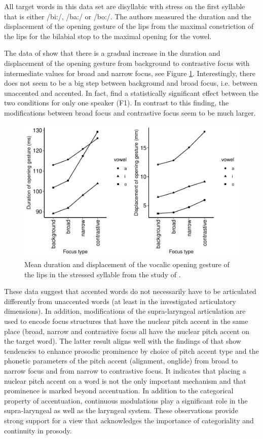 All target words in this data set are disyllabic with stress on the first syllable that is either /bi:/, /ba:/ or /bo:/. The authors measured the duration and the displacement of the opening gesture of the lips from the maximal constriction of the lips for the bilabial stop to the maximal opening for the vowel.

The data of \citet{MückeGrice2014} show that there is a gradual increase in the duration and displacement of the opening gesture from background to contrastive focus with intermediate values for broad and narrow focus, see Figure \ref{fig:muecke_grice_2014}. Interestingly, there does not seem to be a big step between background and broad focus, i.e. between unaccented and accented. In fact, \citet{MückeGrice2014} find a statistically significant effect between the two conditions for only one speaker (F1). In contrast to this finding, the modifications between broad focus and contrastive focus seem to be much larger. 

\begin{figure}
\includegraphics[width=\textwidth]{figures/ch4/muecke_grice_2014.pdf}
\caption{Mean duration and displacement of the vocalic opening gesture of the lips in the stressed syllable from the study of \citet{MückeGrice2014}.}
\label{fig:muecke_grice_2014}
\end{figure}

These data suggest that accented words do not necessarily have to be articulated differently from unaccented words (at least in the investigated articulatory dimensions). In addition, modifications of the supra-laryngeal articulation are used to encode focus structures that have the nuclear pitch accent in the same place (broad, narrow and contrastive focus all have the nuclear pitch accent on the target word). The latter result aligns well with the findings of \citet{Griceetal2017} that show tendencies to enhance prosodic prominence by choice of pitch accent type and the phonetic parameters of the pitch accent (alignment, onglide) from broad to narrow focus and from narrow to contrastive focus. It indicates that placing a nuclear pitch accent on a word is not the only important mechanism and that prominence is marked beyond accentuation. In addition to the categorical property of accentuation, continuous modulations play a significant role in the supra-laryngeal as well as the laryngeal system. These observations provide strong support for a view that acknowledges the importance of categoriality and continuity in prosody.

